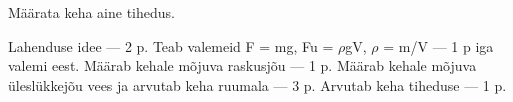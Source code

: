 
Määrata keha aine tihedus.

\hint

\solu
Lahenduse idee --- 2 p. Teab valemeid F = mg, Fu = $\rho$gV, $\rho$ = m/V --- 1 p iga valemi eest. Määrab kehale mõjuva raskusjõu --- 1 p. Määrab kehale mõjuva üleslükkejõu vees ja arvutab keha ruumala --- 3 p. Arvutab keha tiheduse --- 1 p.
\probend
